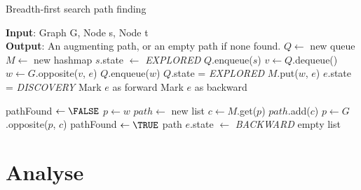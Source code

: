 \begin{algorithm}
 \caption{Breadth-first search path finding}
 \label{alg:breadthfirst}
 \begin{algorithmic}
  \REQUIRE \textbf{Input}: Graph G, Node s, Node t \\ 
\textbf{Output}: An augmenting path, or an empty path if none found.
  \STATE $Q \gets $ new queue
  \STATE $M \gets $ new hashmap
  \STATE $s$.state $\gets$ \textit{EXPLORED}
  \STATE $Q$.enqueue($s$)
   \STATE $v \gets Q$.dequeue()
    \STATE $w \gets G$.opposite($v$, $e$)
      \STATE $Q$.enqueue($w$)
      \STATE $Q$.state = \textit{EXPLORED}
      \STATE $M$.put($w$, $e$) 
      \STATE $e$.state = \textit{DISCOVERY}
         \STATE Mark $e$ as forward
      \ELSE
         \STATE Mark $e$ as backward
      \ENDIF

         \STATE pathFound $\gets \FALSE$
         \STATE $p \gets w$
         \STATE $path \gets $ new list
          \STATE $c \gets M$.get($p$) 
          \STATE $path$.add($c$)      
          \STATE $p \gets G$.opposite($p$, $c$) 
            \STATE pathFound $\gets \TRUE$ 
          \ENDIF
         \ENDWHILE
         \RETURN path
      \ENDIF
    \ENDIF
    \ELSE
      \STATE $e$.state $\gets$ \textit{BACKWARD}
    \ENDIF
   \ENDFOR
  \ENDWHILE
  \RETURN empty list 
 \end{algorithmic}
\end{algorithm}

\section{Analyse}

